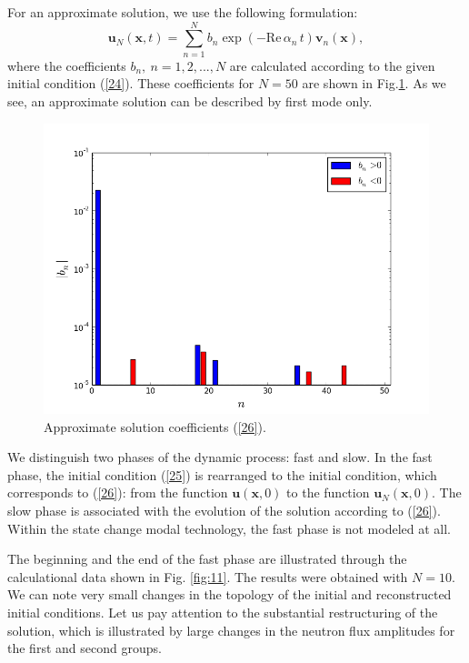 \documentclass[authoryear]{elsarticle}
\begin{document}
For an approximate solution, we use the following formulation:
\begin{equation}\label{26}
 \bm u_N(\bm x, t) = 
 \sum_{n=1}^{N} b_n \exp(- \mathrm{Re} \, \alpha_n \, t) \bm v_n(\bm x) ,  
\end{equation} 
where the coefficients $b_n, \ n = 1,2, ..., N$ are calculated according to the given initial condition (\ref{24}). These coefficients for $N=50$ are shown in Fig.\ref{fig:10}. 
As we see, an approximate solution can be described by first mode only.

\begin{figure}[!h]
  \begin{center}
    \includegraphics[width=0.95\linewidth] {10.png}
	\caption{Approximate solution coefficients (\ref{26}).}
	\label{fig:10}
  \end{center}
\end{figure} 

We distinguish two phases of the dynamic process: fast and slow. In the fast phase, the initial condition (\ref{25}) 
is rearranged to the initial condition, which corresponds to (\ref{26}): from the function
$\bm u(\bm x, 0)$ to the function $\bm u_N(\bm x, 0)$. The slow phase is associated with the evolution of the solution according to (\ref{26}).
Within the state change modal technology, the fast phase is not modeled at all.

The beginning and the end of the fast phase are illustrated through the calculational data shown in Fig. \ref{fig:11}. The results were obtained with
 $N=10$. We can note very small changes in the topology of the initial and reconstructed initial conditions. Let us pay attention to the substantial restructuring of the solution, which is illustrated by large changes in the neutron flux amplitudes for the first and second groups.
\end{document}
